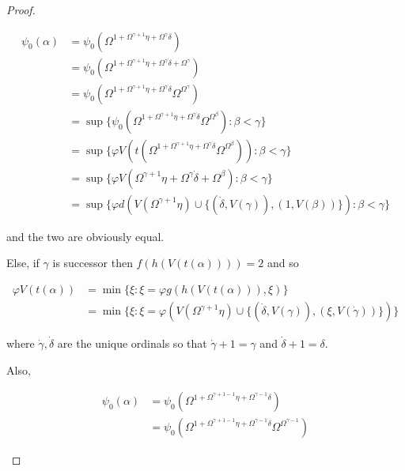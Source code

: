 \documentclass{article}
\theoremstyle{definition}
\theoremstyle{plain}
\theoremstyle{plain}
\theoremstyle{plain}
\theoremstyle{plain}
\theoremstyle{remark}
\theoremstyle{remark}
\theoremstyle{remark}
\theoremstyle{plain}
\theoremstyle{plain}
\begin{document}
\begin{proof}
\begin{enumerate}
\begin{enumerate}
\begin{enumerate}
\begin{enumerate}
                \begin{equation}
                \begin{split}
                \psi_0(\alpha) & = \psi_0(\Omega^{1 + \Omega^{\gamma+1} \eta + \Omega^\gamma \delta}) \\ & = \psi_0(\Omega^{1 + \Omega^{\gamma+1} \eta + \Omega^\gamma \dot{\delta} + \Omega^\gamma}) \\ & = \psi_0(\Omega^{1 + \Omega^{\gamma+1} \eta + \Omega^\gamma \dot{\delta}} \Omega^{\Omega^\gamma}) \\ & = \sup\{\psi_0(\Omega^{1 + \Omega^{\gamma+1} \eta + \Omega^\gamma \dot{\delta}} \Omega^{\Omega^\beta}): \beta < \gamma\} \\ & = \sup\{\varphi V(t(\Omega^{1 + \Omega^{\gamma+1} \eta + \Omega^\gamma \dot{\delta}} \Omega^{\Omega^\beta})): \beta < \gamma\} \\ & = \sup\{\varphi V(\Omega^{\gamma+1} \eta + \Omega^\gamma \dot{\delta} + \Omega^\beta): \beta < \gamma\} \\ & = \sup\{\varphi d(V(\Omega^{\gamma+1} \eta) \cup \{(\dot{\delta}, V(\gamma)), (1,V(\beta))\}): \beta < \gamma\}
                \end{split}
                \end{equation}

                and the two are obviously equal.

                Else, if $\gamma$ is successor then $f(h(V(t(\alpha)))) = 2$ and so

                \begin{equation}
                \begin{split}
                \varphi V(t(\alpha)) & = \min\{\xi: \xi = \varphi g(h(V(t(\alpha))), \xi)\} \\ & = \min\{\xi: \xi = \varphi (V(\Omega^{\gamma+1} \eta) \cup \{(\dot{\delta}, V(\gamma)),(\xi, V(\dot{\gamma}))\})\}
                \end{split}
                \end{equation}

                where $\dot{\gamma}, \dot{\delta}$ are the unique ordinals so that $\dot{\gamma}+1 = \gamma$ and $\dot{\delta}+1 = \delta$.

                Also,

                \begin{equation}
                \begin{split}
                \psi_0(\alpha) & = \psi_0(\Omega^{1 + \Omega^{\gamma+1-1} \eta + \Omega^{\gamma-1} \delta}) \\ & = \psi_0(\Omega^{1 + \Omega^{\gamma+1-1} \eta + \Omega^{\gamma-1} \dot{\delta}} \Omega^{\Omega^{\gamma-1}})
                \end{split}
                \end{equation}


\end{enumerate}
\end{enumerate}
\end{enumerate}
\end{enumerate}
\end{proof}
\end{document}
